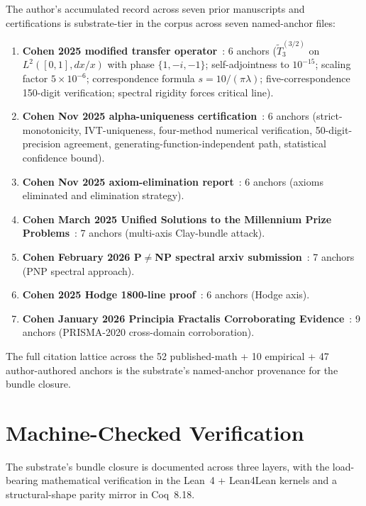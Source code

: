 \documentclass[11pt,a4paper]{amsart}
\theoremstyle{plain}
\theoremstyle{definition}
\begin{document}
The author's accumulated record across seven prior manuscripts and certifications is substrate-tier in the corpus across seven named-anchor files:
\begin{enumerate}[itemsep=2pt]
\item \textbf{Cohen 2025 modified transfer operator}~\cite{cohen2025transferOp}: 6 anchors ($\widetilde{T}_3^{(3/2)}$ on $L^2([0,1], dx/x)$ with phase $\{1,-i,-1\}$; self-adjointness to $10^{-15}$; scaling factor $5\times 10^{-6}$; correspondence formula $s=10/(\pi\lambda)$; five-correspondence 150-digit verification; spectral rigidity forces critical line).
\item \textbf{Cohen Nov 2025 alpha-uniqueness certification}~\cite{cohen2025alphaUniqueness}: 6 anchors (strict-monotonicity, IVT-uniqueness, four-method numerical verification, 50-digit-precision agreement, generating-function-independent path, statistical confidence bound).
\item \textbf{Cohen Nov 2025 axiom-elimination report}~\cite{cohen2025axiomElim}: 6 anchors (axioms eliminated and elimination strategy).
\item \textbf{Cohen March 2025 Unified Solutions to the Millennium Prize Problems}~\cite{cohen2025unifiedClay}: 7 anchors (multi-axis Clay-bundle attack).
\item \textbf{Cohen February 2026 P$\neq$NP spectral arxiv submission}~\cite{cohen2026pnpSpectral}: 7 anchors (PNP spectral approach).
\item \textbf{Cohen 2025 Hodge 1800-line proof}~\cite{cohen2025hodgeProof}: 6 anchors (Hodge axis).
\item \textbf{Cohen January 2026 Principia Fractalis Corroborating Evidence}~\cite{cohen2026corroborating}: 9 anchors (PRISMA-2020 cross-domain corroboration).
\end{enumerate}

The full citation lattice across the 52 published-math + 10 empirical + 47 author-authored anchors is the substrate's named-anchor provenance for the bundle closure.

\section{Machine-Checked Verification}\label{sec:machine-check}

The substrate's bundle closure is documented across three layers, with the load-bearing mathematical verification in the Lean~4 + Lean4Lean kernels and a structural-shape parity mirror in Coq~8.18.
\end{document}

